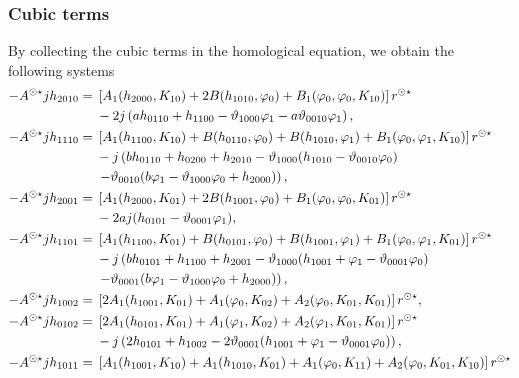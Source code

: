 \subsubsection{Cubic terms}
By collecting the cubic terms in the homological equation, we obtain the following systems
\begin{equation}
\label{btdde:eq:third_order_systems_tbt}
\begin{aligned}
-\SUNSTAR A jh_{2010} ={}& \left[A_1(h_{2000},K_{10})+ 2 B(h_{1010},\phi_0) + B_1(\phi_0,\phi_0,K_{10})\right]\rss \\
                         & -2j\left(a h_{0110} + h_{1100} - \vartheta_{1000} \phi_1 - a \vartheta_{0010} \phi_1   \right), \\
-\SUNSTAR A jh_{1110} ={}& \left[A_1(h_{1100},K_{10}) + B(h_{0110},\phi_0) + B(h_{1010},\phi_1) + B_1(\phi_0,\phi_1,K_{10})\right]\rss \\
                         & -j\left(b h_{0110} + h_{0200} + h_{2010} - \vartheta_{1000} (h_{1010} - \vartheta_{0010} \phi_0) \right. \\
                         & \left. - \vartheta_{0010} (b \phi_1 - \vartheta_{1000} \phi_0 + h_{2000})  \right), \\
-\SUNSTAR A jh_{2001} ={}& \left[A_1(h_{2000},K_{01}) + 2 B(h_{1001},\phi_0) + B_1(\phi_0,\phi_0,K_{01})\right]\rss \\
                         & - 2 a j(h_{0101} - \vartheta_{0001} \phi_1), \\
-\SUNSTAR A jh_{1101} ={}& \left[A_1(h_{1100},K_{01}) + B(h_{0101},\phi_0) + B(h_{1001},\phi_1) + B_1(\phi_0,\phi_1,K_{01})\right]\rss \\
                        & -j\left(b h_{0101} + h_{1100} + h_{2001} - \vartheta_{1000} (h_{1001} + \phi_1 - \vartheta_{0001} \phi_0) \right. \\
                        & \left. - \vartheta_{0001} (b \phi_1 - \vartheta_{1000} \phi_0 + h_{2000})  \right), \\
-\SUNSTAR A jh_{1002} ={}& \left[2 A_1(h_{1001},K_{01}) + A_1(\phi_0,K_{02}) + A_2(\phi_0,K_{01},K_{01})\right]\rss, \\
-\SUNSTAR A jh_{0102} ={}& \left[2 A_1(h_{0101},K_{01}) + A_1(\phi_1,K_{02}) + A_2(\phi_1,K_{01},K_{01})\right]\rss \\
                         & -j\left(2 h_{0101} + h_{1002} - 2 \vartheta_{0001} (h_{1001} + \phi_1 - \vartheta_{0001} \phi_0) \right), \\
-\SUNSTAR A jh_{1011} ={}& \left[A_1(h_{1001},K_{10}) + A_1(h_{1010},K_{01}) + A_1(\phi_0,K_{11}) + A_2(\phi_0,K_{01},K_{10})\right]\rss \\

\end{aligned}
\end{equation}
